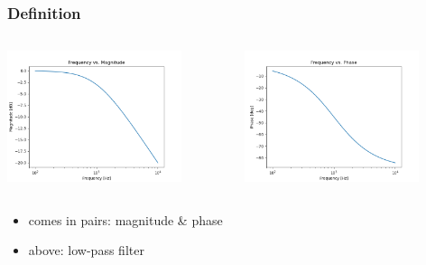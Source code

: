 \documentclass[aspectratio=169]{beamer}
\begin{document}
\begin{frame}
    \frametitle{Definition}
    \begin{columns}
        \centering
        \includegraphics[width=0.8\textwidth]{Figure_1.png}

        \centering
        \includegraphics[width=0.8\textwidth]{Figure_2.png}
    \end{columns}
    \begin{itemize}
        \item comes in pairs: magnitude \& phase
        \item above: low-pass filter
    \end{itemize}
\end{frame}
\end{document}
